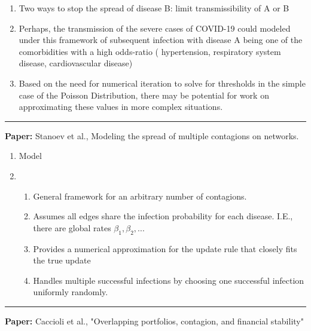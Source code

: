 \documentclass[11pt]{article}
\begin{document}
\begin{enumerate}
\begin{enumerate}
    \end{enumerate}
    \item Two ways to stop the spread of disease B: limit transmissibility of A or B
    \item Perhaps, the transmission of the severe cases of COVID-19 could modeled under this framework of subsequent infection with disease A being one of the comorbidities with a high odds-ratio ( hypertension, respiratory system disease, cardiovascular
    disease)
    \item Based on the need for numerical iteration to solve for thresholds in the simple case of the Poisson Distribution, there may be potential for work on approximating these values in more complex situations. 
    
\end{enumerate}
\smallskip
\rule{\textwidth}{0.01in}

\textbf{Paper: } Stanoev et al., Modeling the spread of multiple contagions on networks.

\begin{enumerate}
    \item Model
    \item \begin{enumerate}
        \item General framework for an arbitrary number of contagions.
        \item Assumes all edges share the infection probability for each disease. I.E., there are global rates $\beta_{1},\beta_{2},...$
        \item Provides a numerical approximation for the update rule that closely fits the true update
        \item Handles multiple successful infections by choosing one successful infection uniformly randomly.
    \end{enumerate}
\end{enumerate}

\smallskip
\rule{\textwidth}{0.01in}

\textbf{Paper:} Caccioli et al., "Overlapping portfolios, contagion, and financial stability" 
\end{document}
